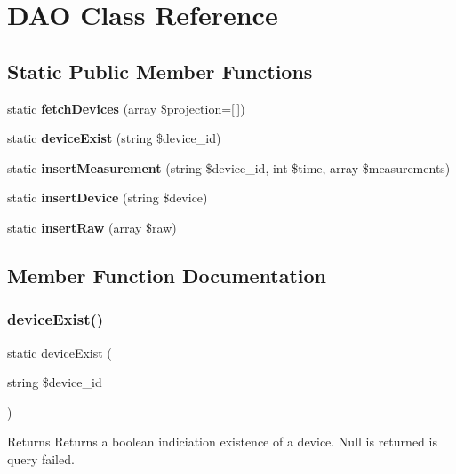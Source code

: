 \section{D\+AO Class Reference}
\label{class_lora_1_1_d_a_o}
\subsection*{Static Public Member Functions}
\begin{DoxyCompactItemize}
\item 
static \textbf{ fetch\+Devices} (array \$projection=[$\,$])
\item 
static \textbf{ device\+Exist} (string \$device\+\_\+id)
\item 
static \textbf{ insert\+Measurement} (string \$device\+\_\+id, int \$time, array \$measurements)
\item 
static \textbf{ insert\+Device} (string \$device)
\item 
static \textbf{ insert\+Raw} (array \$raw)
\end{DoxyCompactItemize}


\subsection{Member Function Documentation}
\mbox{\label{class_lora_1_1_d_a_o_aad2161af4b52afb99e2a931538559823}} 
\subsubsection{device\+Exist()}
{\footnotesize\ttfamily static device\+Exist (\begin{DoxyParamCaption}\item[{string}]{\$device\+\_\+id }\end{DoxyParamCaption})\hspace{0.3cm}{\ttfamily [static]}}

\begin{DoxyReturn}{Returns}
Returns a boolean indiciation existence of a device. Null is returned is query failed. 
\end{DoxyReturn}

